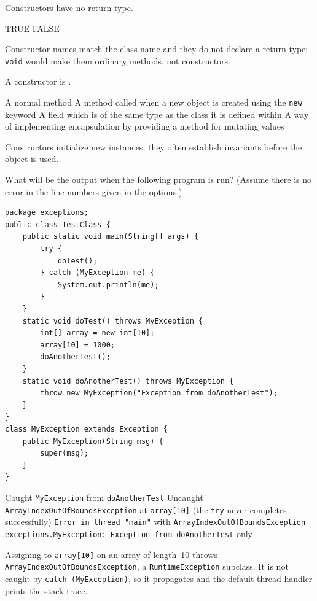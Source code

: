 \question[4]
Constructors have no return type.
\begin{choices}
  \CorrectChoice TRUE
  \choice FALSE
\end{choices}
\begin{solution}
  Constructor names match the class name and they do not declare a return type; \texttt{void} would make them ordinary methods, not constructors.
\end{solution}

\question[4]
A constructor is \blank[10em].
\begin{choices}
  \choice A normal method
  \CorrectChoice A method called when a new object is created using the \texttt{new} keyword
  \choice A field which is of the same type as the class it is defined within
  \choice A way of implementing encapsulation by providing a method for mutating values
\end{choices}
\begin{solution}
  Constructors initialize new instances; they often establish invariants before the object is used.
\end{solution}

\newpage

\question[4]
What will be the output when the following program is run? (Assume there is no error in the line numbers given in the options.)
\begin{lstlisting}[style=java]
package exceptions;
public class TestClass {
    public static void main(String[] args) {
        try {
            doTest();
        } catch (MyException me) {
            System.out.println(me);
        }
    }
    static void doTest() throws MyException {
        int[] array = new int[10];
        array[10] = 1000;
        doAnotherTest();
    }
    static void doAnotherTest() throws MyException {
        throw new MyException("Exception from doAnotherTest");
    }
}
class MyException extends Exception {
    public MyException(String msg) {
        super(msg);
    }
}
\end{lstlisting}
\begin{choices}
  \choice Caught \texttt{MyException} from \texttt{doAnotherTest}
  \CorrectChoice Uncaught \texttt{ArrayIndexOutOfBoundsException} at \texttt{array[10]} (the \texttt{try} never completes successfully)
  \choice \texttt{Error in thread "main"} with \texttt{ArrayIndexOutOfBoundsException}
  \choice \texttt{exceptions.MyException: Exception from doAnotherTest} only
\end{choices}
\begin{solution}
  Assigning to \texttt{array[10]} on an array of length~10 throws \texttt{ArrayIndexOutOfBoundsException}, a \texttt{RuntimeException} subclass. It is not caught by \texttt{catch (MyException)}, so it propagates and the default thread handler prints the stack trace.
\end{solution}

